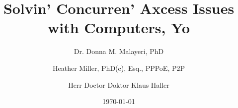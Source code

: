 \documentclass[10pt,twocolumn,letterpaper]{article}
\begin{document}
\title{Solvin' Concurren' Axcess Issues with Computers, Yo}

\author{Dr. Donna M. Malayeri, PhD \and Heather Miller, PhD(c), Esq., PPPoE, P2P \and Herr Doctor Doktor Klaus Haller}
\date{\today}

\maketitle

\pagestyle{empty}
\thispagestyle{empty}

\abstract{
}
\end{document}
